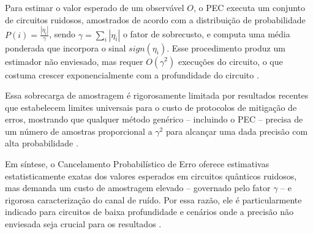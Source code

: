 Para estimar o valor esperado de um observ\'{a}vel $O$, o PEC executa um conjunto de circuitos ruidosos, amostrados de acordo com a distribuiç\~{a}o de probabilidade $P(i) =\frac{|\eta_i|}{\gamma}$, sendo $\gamma = \sum_i |\eta_i|$ o fator de sobrecusto, e computa uma m\'{e}dia ponderada que incorpora o sinal $sign(\eta_i)$. Esse procedimento produz um estimador n\~{a}o enviesado, mas requer $O(\gamma^2)$ execuç\~{o}es do circuito, o que costuma crescer exponencialmente com a profundidade do circuito \cite{PhysRevLett2023_PEC}.

Essa sobrecarga de amostragem \'{e} rigorosamente limitada por resultados recentes que estabelecem limites universais para o custo de protocolos de mitigaç\~{a}o de erros, mostrando que qualquer m\'{e}todo gen\'{e}rico -- incluindo o PEC -- precisa de um n\'{u}mero de amostras proporcional a $\gamma^2$  para alcançar uma dada precis\~{a}o com alta probabilidade \cite{PhysRevResearch2021_PEC}.

Em s\'{i}ntese, o Cancelamento Probabil\'{i}stico de Erro oferece estimativas estatisticamente exatas dos valores esperados em circuitos qu\^{a}nticos ruidosos, mas demanda um custo de amostragem elevado -- governado pelo fator $\gamma$ -- e rigorosa caracterizaç\~{a}o do canal de ru\'{i}do. Por essa raz\~{a}o, ele \'{e} particularmente indicado para circuitos de baixa profundidade e cen\'{a}rios onde a precis\~{a}o n\~{a}o enviesada seja crucial para os resultados \cite{PRXQuantum2024_PEC}.
